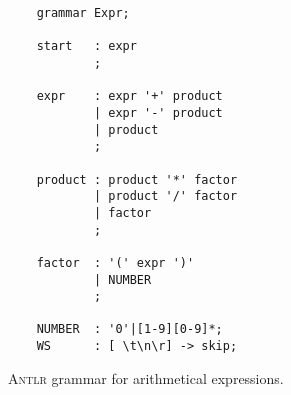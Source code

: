 \begin{figure}[!ht]
\centering
\begin{verbatim}
    grammar Expr;
    
    start   : expr
            ;
    
    expr    : expr '+' product 
            | expr '-' product
            | product        
            ;
    
    product : product '*' factor 
            | product '/' factor 
            | factor
            ;
    
    factor  : '(' expr ')'
            | NUMBER
            ;
    
    NUMBER  : '0'|[1-9][0-9]*;
    WS      : [ \t\n\r] -> skip;
\end{verbatim}
\vspace*{-0.3cm}
\caption{\textsc{Antlr} grammar for arithmetical expressions.}
\label{fig:Expr.g4}
\end{figure}


